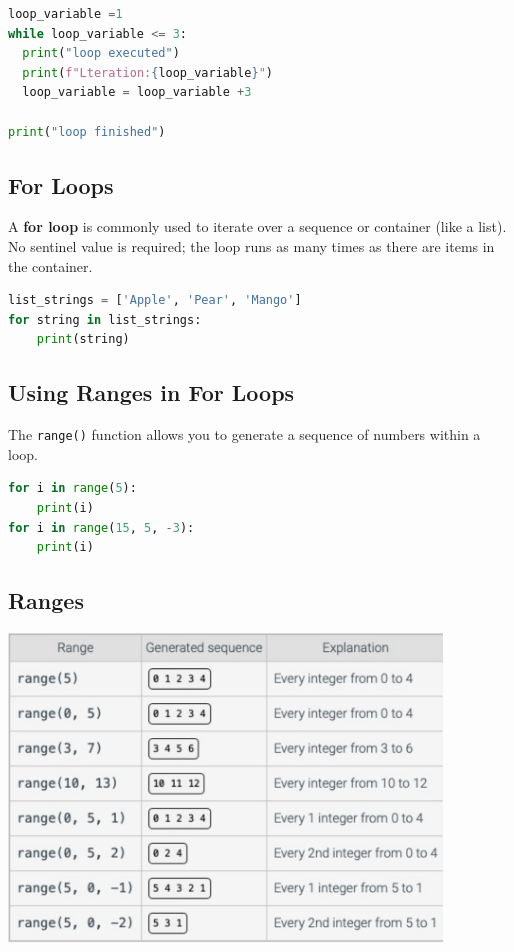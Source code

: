 \documentclass{article}
\begin{document}
\begin{lstlisting}[language=python]
loop_variable =1
while loop_variable <= 3:
  print("loop executed")
  print(f"Lteration:{loop_variable}")
  loop_variable = loop_variable +3

print("loop finished")
\end{lstlisting}

\subsection{For Loops}
A \textbf{for loop} is commonly used to iterate over a sequence or container (like a list). No sentinel value is required; the loop runs as many times as there are items in the container.

\begin{lstlisting}[language=python]
list_strings = ['Apple', 'Pear', 'Mango']
for string in list_strings:
    print(string)
\end{lstlisting}

\subsection{Using Ranges in For Loops}
The \texttt{range()} function allows you to generate a sequence of numbers within a loop.
\begin{lstlisting}[language=python]
for i in range(5):
    print(i)
for i in range(15, 5, -3):
    print(i)
\end{lstlisting}
\subsection{Ranges}
\includegraphics[width=11.5cm]{Lecture_Notes_In_LaTex/imgs/ranges.png}
\end{document}
